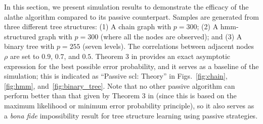In this section, we present   simulation results to demonstrate the efficacy of the \ac{alathe} algorithm compared to its passive counterpart. Samples are generated from three different tree  structures: (1) A chain graph with $p=300$; (2) A \ac{hmm}-structured graph with $p=300$ (where all the nodes are observed); and (3) A binary tree with $p = 255$ (seven levels). The correlations between adjacent nodes $\rho$ are set to $0.9$, $0.7$, and $0.5$. Theorem 3 in \cite{tandon2020exact} provides an exact asymptotic expression for the best possible error probability, and it serves as a baseline of the simulation; this is indicated as ``Passive \ac{scl}: Theory'' in  Figs.~\ref{fig:chain},  \ref{fig:hmm}, and~\ref{fig:binary_tree}. Note that no other passive algorithm can perform better than that given by Theorem 3 in \cite{tandon2020exact} (since this is based on the maximum likelihood or minimum error probability principle), so it also serves as a {\em bona fide} impossibility result for tree structure learning using passive strategies.

